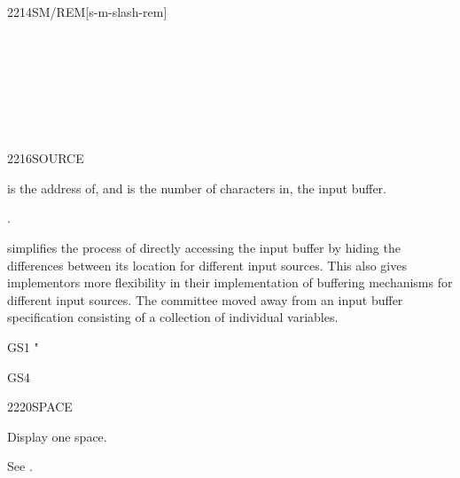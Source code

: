 \begin{worddef}{2214}{SM/REM}[s-m-slash-rem]
\begin{testing}
		 \\
		 \\
		 \\
		 \\
		 \\
		 \\
	\end{testing}
\end{worddef}

\begin{worddef}{2216}{SOURCE}
\item {}

	 is the address of, and  is the number of
	characters in, the input buffer.

\see {}.

	\begin{rationale} %
		 simplifies the process of directly accessing the
		input buffer by hiding the differences between its location
		for different input sources. This also gives implementors more
		flexibility in their implementation of buffering mechanisms
		for different input sources. The committee moved away from an
		input buffer specification consisting of a collection of
		individual variables.
	\end{rationale}

	\begin{testing} %
		\ttfamily
		\word{:} GS1  "  
			   \word{=} \word{Rfrom}  \word{=} \word{;} \\

		\word{:} GS4   \word{!}  \word{;} \\
	\end{testing}
\end{worddef}


\begin{worddef}{2220}{SPACE}
\item \stack{}{}

	Display one space.

	\begin{testing} %
		See .
	\end{testing}
\end{worddef}


